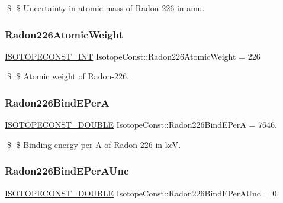 \$ \$ Uncertainty in atomic mass of Radon-\/226 in amu. \mbox{\label{group___isotope_const-_radon-_rn226_gac13a974c7c43bf13c0d28eba7381c271}} 
\subsubsection{\texorpdfstring{Radon226\+Atomic\+Weight}{Radon226AtomicWeight}}
{\footnotesize\ttfamily \mbox{\hyperlink{group___isotope_const-_macros_ga5f18360b3e99483a35c32d789e62621c}{I\+S\+O\+T\+O\+P\+E\+C\+O\+N\+S\+T\+\_\+\+I\+NT}} Isotope\+Const\+::\+Radon226\+Atomic\+Weight = 226}

\$ \$ Atomic weight of Radon-\/226. \mbox{\label{group___isotope_const-_radon-_rn226_ga4b611649a641f412efb1eca7e2488c30}} 
\subsubsection{\texorpdfstring{Radon226\+Bind\+E\+PerA}{Radon226BindEPerA}}
{\footnotesize\ttfamily \mbox{\hyperlink{group___isotope_const-_macros_ga8f45a7272ce02c0b4c65c44636ed719a}{I\+S\+O\+T\+O\+P\+E\+C\+O\+N\+S\+T\+\_\+\+D\+O\+U\+B\+LE}} Isotope\+Const\+::\+Radon226\+Bind\+E\+PerA = 7646.}

\$ \$ Binding energy per A of Radon-\/226 in keV. \mbox{\label{group___isotope_const-_radon-_rn226_gac4f9d3e4677e28790e2189a795d128e8}} 
\subsubsection{\texorpdfstring{Radon226\+Bind\+E\+Per\+A\+Unc}{Radon226BindEPerAUnc}}
{\footnotesize\ttfamily \mbox{\hyperlink{group___isotope_const-_macros_ga8f45a7272ce02c0b4c65c44636ed719a}{I\+S\+O\+T\+O\+P\+E\+C\+O\+N\+S\+T\+\_\+\+D\+O\+U\+B\+LE}} Isotope\+Const\+::\+Radon226\+Bind\+E\+Per\+A\+Unc = 0.}

